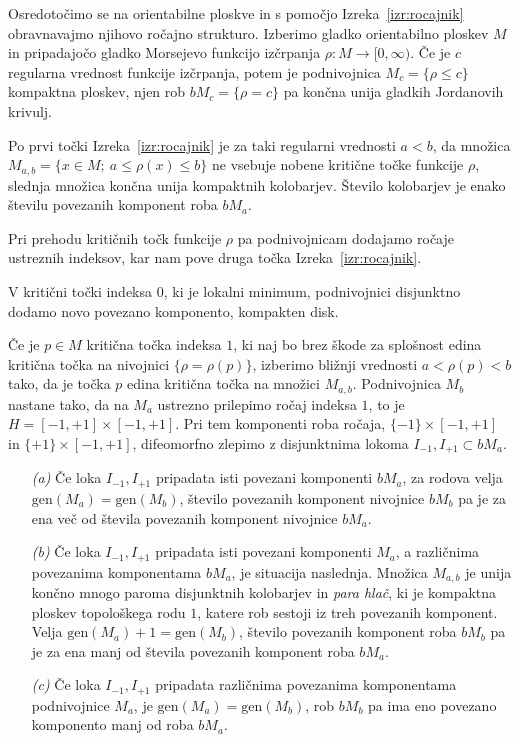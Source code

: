 \documentclass[12pt,a4paper,twoside]{article}
\theoremstyle{definition} %
\theoremstyle{plain} %
\numberwithin{equation}{section}  %
\begin{document}
Osredotočimo se na orientabilne ploskve in s pomočjo Izreka~\ref{izr:rocajnik} obravnavajmo njihovo ročajno strukturo. 
Izberimo gladko orientabilno ploskev $M$ in pripadajočo gladko Morsejevo funkcijo izčrpanja $\rho \colon M \to [0, \infty)$. Če je $c$ regularna vrednost funkcije izčrpanja, potem je podnivojnica $M_{c} = \{ \rho \leq c \}$ kompaktna ploskev, njen rob $bM_{c} = \{ \rho = c \}$ pa končna unija gladkih Jordanovih krivulj. 

Po prvi točki Izreka~\ref{izr:rocajnik} je za taki regularni vrednosti $a<b$, da množica $M_{a,b} = \{ x \in M; \ a \leq \rho(x) \leq b \}$ ne vsebuje nobene kritične točke funkcije $\rho$, slednja množica končna unija kompaktnih kolobarjev. Število kolobarjev je enako številu povezanih komponent roba $bM_{a}$.

Pri prehodu kritičnih točk funkcije $\rho$ pa podnivojnicam dodajamo ročaje ustreznih indeksov, kar nam pove druga točka Izreka~\ref{izr:rocajnik}.

V kritični točki indeksa $0$, ki je lokalni minimum, podnivojnici disjunktno dodamo novo povezano komponento, kompakten disk.

Če je $p \in M$ kritična točka indeksa $1$, ki naj bo brez škode za splošnost edina kritična točka na nivojnici $\{ \rho = \rho(p) \}$, izberimo bližnji vrednosti $a<\rho(p)<b$ tako, da je točka $p$ edina kritična točka na množici $M_{a,b}$. Podnivojnica $M_{b}$ nastane tako, da na $M_{a}$ ustrezno prilepimo ročaj indeksa $1$, to je $H = [-1,+1] \times [-1,+1]$. Pri tem komponenti roba ročaja, $\{-1\} \times [-1,+1]$ in $\{+1\} \times [-1,+1]$, difeomorfno zlepimo z disjunktnima lokoma $I_{-1}, I_{+1} \subset bM_{a}$.
\begin{itemize}
\item[\textit{(a)}] 
	Če loka $I_{-1}, I_{+1}$ pripadata isti povezani komponenti $bM_{a}$, za rodova velja $\text{gen}(M_{a}) = \text{gen}(M_{b})$, število povezanih komponent nivojnice $bM_{b}$ pa je za ena več od števila povezanih komponent nivojnice $bM_{a}$.
\item[\textit{(b)}]
	Če loka $I_{-1}, I_{+1}$ pripadata isti povezani komponenti $M_{a}$, a različnima povezanima komponentama $bM_{a}$, je situacija naslednja.
	Množica $M_{a,b}$ je unija končno mnogo paroma disjunktnih kolobarjev in \emph{para hlač}, ki je kompaktna ploskev topološkega rodu $1$, katere rob sestoji iz treh povezanih komponent.
	Velja $\text{gen}(M_{a})+1 = \text{gen}(M_{b})$, število povezanih komponent roba $bM_{b}$ pa je za ena manj od števila povezanih komponent roba $bM_{a}$.
\item[\textit{(c)}]
	Če loka $I_{-1}, I_{+1}$ pripadata različnima povezanima komponentama podnivojnice $M_{a}$, je $\text{gen}(M_{a}) = \text{gen}(M_{b})$, rob $bM_{b}$ pa ima eno povezano komponento manj od roba $bM_{a}$.
\end{itemize}
\end{document}

